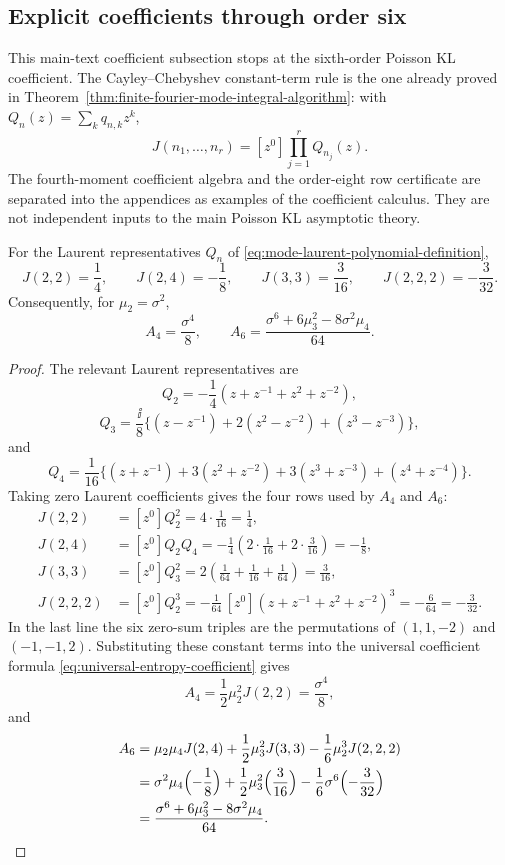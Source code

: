\subsection{Explicit coefficients through order six}
\label{subsec:explicit-sixth-order-coefficients}

This main-text coefficient subsection stops at the sixth-order Poisson KL
coefficient.  The Cayley--Chebyshev constant-term rule is the one already
proved in Theorem~\ref{thm:finite-fourier-mode-integral-algorithm}: with
\(Q_n(z)=\sum_kq_{n,k}z^k\),
\[
J(n_1,\ldots,n_r)=[z^0]\prod_{j=1}^rQ_{n_j}(z).
\]
The fourth-moment coefficient algebra and the order-eight row certificate are
separated into the appendices as examples of the coefficient calculus.  They
are not independent inputs to the main Poisson KL asymptotic theory.

\begin{lemma}%
\label{lem:sixth-order-coefficient-arithmetic}
For the Laurent representatives \(Q_n\) of
\eqref{eq:mode-laurent-polynomial-definition},
\[
J(2,2)=\frac14,\qquad
J(2,4)=-\frac18,\qquad
J(3,3)=\frac3{16},\qquad
J(2,2,2)=-\frac3{32}.
\]
Consequently, for \(\mu_2=\sigma^2\),
\[
A_4=\frac{\sigma^4}{8},\qquad
A_6=\frac{\sigma^6+6\mu_3^2-8\sigma^2\mu_4}{64}.
\]
\end{lemma}

\begin{proof}
The relevant Laurent representatives are
\[
Q_2=-\frac14(z+z^{-1}+z^2+z^{-2}),
\]
\[
Q_3=\frac{\ii}{8}\{(z-z^{-1})+2(z^2-z^{-2})+(z^3-z^{-3})\},
\]
and
\[
Q_4=\frac1{16}\{(z+z^{-1})+3(z^2+z^{-2})
  +3(z^3+z^{-3})+(z^4+z^{-4})\}.
\]
Taking zero Laurent coefficients gives the four rows used by \(A_4\) and
\(A_6\):
\[
\begin{aligned}
J(2,2)
&=[z^0]Q_2^2
=4\cdot\frac1{16}
=\frac14,\\
J(2,4)
&=[z^0]Q_2Q_4
=-\frac14\left(2\cdot\frac1{16}+2\cdot\frac3{16}\right)
=-\frac18,\\
J(3,3)
&=[z^0]Q_3^2
=2\left(\frac1{64}+\frac1{16}+\frac1{64}\right)
=\frac3{16},\\
J(2,2,2)
&=[z^0]Q_2^3
=-\frac1{64}\,[z^0](z+z^{-1}+z^2+z^{-2})^3
=-\frac6{64}
=-\frac3{32}.
\end{aligned}
\]
In the last line the six zero-sum triples are the permutations of
\((1,1,-2)\) and \((-1,-1,2)\).  Substituting these constant terms into the
universal coefficient formula \eqref{eq:universal-entropy-coefficient} gives
\[
A_4=\frac12\mu_2^2J(2,2)=\frac{\sigma^4}{8},
\]
and
\[
\begin{aligned}
A_6
&=\mu_2\mu_4J(2,4)+\frac12\mu_3^2J(3,3)
-\frac16\mu_2^3J(2,2,2)\\
&=\sigma^2\mu_4\Bigl(-\frac18\Bigr)
+\frac12\mu_3^2\Bigl(\frac3{16}\Bigr)
-\frac16\sigma^6\Bigl(-\frac3{32}\Bigr)\\
&=\frac{\sigma^6+6\mu_3^2-8\sigma^2\mu_4}{64}.
\end{aligned}
\]
\end{proof}

